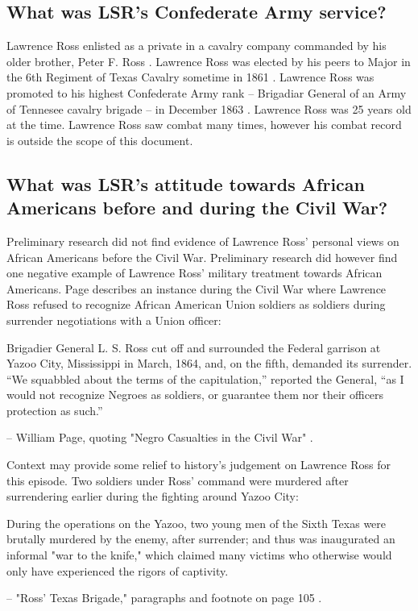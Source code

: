 \documentclass[12pt]{article}
\begin{document}
\newpage
\subsection{What was LSR's Confederate Army service?}
Lawrence Ross enlisted as a private in a cavalry company commanded by his older brother, Peter F. Ross \cite{rosspapersummary}. Lawrence Ross was elected by his peers to Major in the 6th Regiment of Texas Cavalry sometime in 1861 \cite[pg. 36--37]{texasbrigade}. Lawrence Ross was promoted to his highest Confederate Army rank -- Brigadiar General of an Army of Tennesee cavalry brigade -- in December 1863 \cite{rosspapersummary}. Lawrence Ross was 25 years old at the time. Lawrence Ross saw combat many times, however his combat record is outside the scope of this document. 

\newpage
\subsection{What was LSR's attitude towards African Americans before and during the Civil War?}
Preliminary research did not find evidence of Lawrence Ross' personal views on African Americans before the Civil War. Preliminary research did however find one negative example of Lawrence Ross' military treatment towards African Americans. Page describes an instance during the Civil War where Lawrence Ross refused to recognize African American Union soldiers as soldiers during surrender negotiations with a Union officer:
\begin{displayquote}
Brigadier General L. S. Ross cut off and surrounded the Federal garrison at Yazoo City, Mississippi in March, 1864, and, on the fifth, demanded its surrender.  “We squabbled about the terms of the capitulation,” reported the General, “as I would not recognize Negroes as soldiers, or guarantee them nor their officers protection as such.”

-- William Page, quoting "Negro Casualties in the Civil War" \cite[pg. 62]{page}.
\end{displayquote}

Context may provide some relief to history's judgement on Lawrence Ross for this episode. Two soldiers under Ross' command were murdered after surrendering earlier during the fighting around Yazoo City:
\begin{displayquote}
During the operations on the Yazoo, two young men of the Sixth Texas were brutally murdered by the enemy, after surrender; and thus was inaugurated an informal "war to the knife," which claimed many victims who otherwise would only have experienced the rigors of captivity. 

-- "Ross' Texas Brigade," paragraphs and footnote on page 105 \cite[pg. 105]{texasbrigade}.
\end{displayquote}
\end{document}
